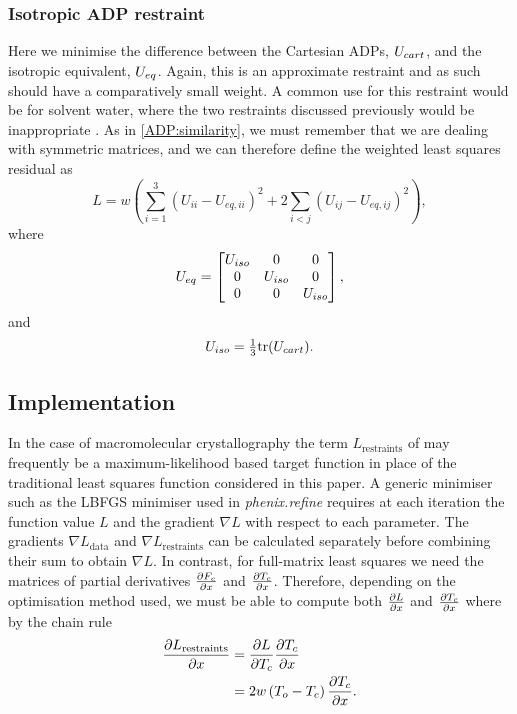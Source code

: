 \documentclass[pdf]{iucr}
\begin{document}


\subsubsection{Isotropic ADP restraint}
Here we minimise the difference between the Cartesian ADPs, $U_{cart}$, and the isotropic equivalent, $U_{eq}$. Again, this is an approximate restraint and as such should have a comparatively small weight. A common use for this restraint would be for solvent water, where the two restraints discussed previously would be inappropriate \cite{SHELX:man97}. As in \textsection \ref{ADP:similarity}, we must remember that we are dealing with symmetric matrices, and we can therefore define the weighted least squares residual as
\begin{equation}
\label{eqn:isotropic_adp}
L = w \left( \sum_{i=1}^3 (U_{ii} - U_{eq,ii})^2 + 2 \sum_{i<j} (U_{ij} - U_{eq,ij})^2 \right) ,
\end{equation}
where
\begin{equation}
U_{eq} = 
\begin{bmatrix} U_{iso} & 0 & 0\\
  0 & U_{iso} & 0\\
  0 & 0 & U_{iso}\end{bmatrix},
\end{equation}
and
\begin{equation}
U_{iso} = \tfrac{1}{3} \mathrm{tr}(U_{cart}).
\end{equation}


\subsection{Implementation}

In the case of macromolecular crystallography the term $L_\text{restraints}$ of  may frequently be a maximum-likelihood based target function in place of the traditional least squares function considered in this paper. A generic minimiser such as the LBFGS minimiser used in \emph{phenix.refine} \cite{Afonine:ba5180} requires at each iteration the function value $L$ and the  gradient $\nabla L$ with respect to each parameter. The gradients $\nabla L_\text{data}$ and $\nabla L_\text{restraints}$ can be calculated separately before combining their sum to obtain $\nabla L$. In contrast, for full-matrix least squares we need the matrices of partial derivatives $\frac{\partial F_c}{\partial x}$ and $\frac{\partial T_c}{\partial x}$. Therefore, depending on the optimisation method used, we must be able to compute both $\frac{\partial L}{\partial x}$ and $\frac{\partial T_c}{\partial x}$ where by the chain rule
\begin{align}
\frac{\partial L_\text{restraints}}{\partial x} &= \frac{\partial L}{\partial T_c} \frac{\partial T_c}{\partial x} \nonumber\\
                             &= 2 w \left(T_o - T_c \right) \frac{\partial T_c}{\partial x}
\label{eqn:}.
\end{align}
\end{document}
